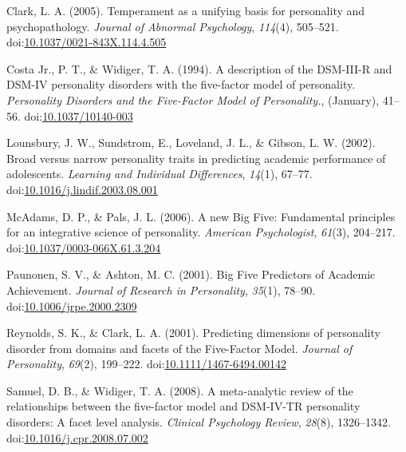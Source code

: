 \documentclass[man]{apa6}
\theoremstyle{definition}
\theoremstyle{definition}
\theoremstyle{definition}
\theoremstyle{remark}
\begin{document}
\begingroup
\setlength{\parindent}{-0.5in}
\setlength{\leftskip}{0.5in}

\hypertarget{refs}{}
\leavevmode\hypertarget{ref-Clark2005}{}%
Clark, L. A. (2005). Temperament as a unifying basis for personality and
psychopathology. \emph{Journal of Abnormal Psychology}, \emph{114}(4),
505--521.
doi:\href{https://doi.org/10.1037/0021-843X.114.4.505}{10.1037/0021-843X.114.4.505}

\leavevmode\hypertarget{ref-Widiger1994}{}%
Costa Jr., P. T., \& Widiger, T. A. (1994). A description of the
DSM-III-R and DSM-IV personality disorders with the five-factor model of
personality. \emph{Personality Disorders and the Five-Factor Model of
Personality.}, (January), 41--56.
doi:\href{https://doi.org/10.1037/10140-003}{10.1037/10140-003}

\leavevmode\hypertarget{ref-Lounsbury2002}{}%
Lounsbury, J. W., Sundstrom, E., Loveland, J. L., \& Gibson, L. W.
(2002). Broad versus narrow personality traits in predicting academic
performance of adolescents. \emph{Learning and Individual Differences},
\emph{14}(1), 67--77.
doi:\href{https://doi.org/10.1016/j.lindif.2003.08.001}{10.1016/j.lindif.2003.08.001}

\leavevmode\hypertarget{ref-McAdams2006a}{}%
McAdams, D. P., \& Pals, J. L. (2006). A new Big Five: Fundamental
principles for an integrative science of personality. \emph{American
Psychologist}, \emph{61}(3), 204--217.
doi:\href{https://doi.org/10.1037/0003-066X.61.3.204}{10.1037/0003-066X.61.3.204}

\leavevmode\hypertarget{ref-Paunonen2001}{}%
Paunonen, S. V., \& Ashton, M. C. (2001). Big Five Predictors of
Academic Achievement. \emph{Journal of Research in Personality},
\emph{35}(1), 78--90.
doi:\href{https://doi.org/10.1006/jrpe.2000.2309}{10.1006/jrpe.2000.2309}

\leavevmode\hypertarget{ref-ClarkReynolds2001}{}%
Reynolds, S. K., \& Clark, L. A. (2001). Predicting dimensions of
personality disorder from domains and facets of the Five-Factor Model.
\emph{Journal of Personality}, \emph{69}(2), 199--222.
doi:\href{https://doi.org/10.1111/1467-6494.00142}{10.1111/1467-6494.00142}

\leavevmode\hypertarget{ref-SamuelWidiger2008}{}%
Samuel, D. B., \& Widiger, T. A. (2008). A meta-analytic review of the
relationships between the five-factor model and DSM-IV-TR personality
disorders: A facet level analysis. \emph{Clinical Psychology Review},
\emph{28}(8), 1326--1342.
doi:\href{https://doi.org/10.1016/j.cpr.2008.07.002}{10.1016/j.cpr.2008.07.002}
\end{document}
